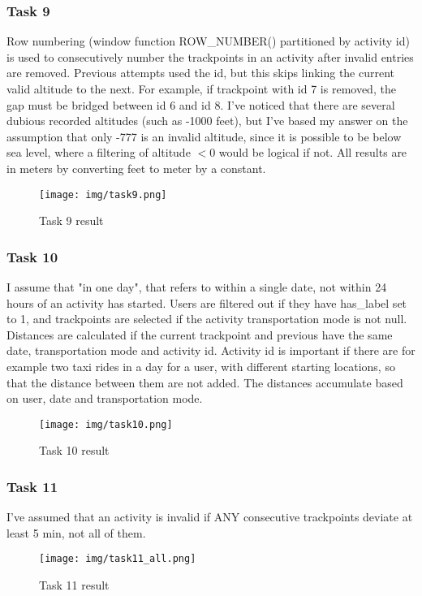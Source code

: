 \documentclass[12pt, titlepage]{report}
\begin{document}
\subsubsection*{Task 9}
Row numbering (window function ROW\_NUMBER() partitioned by activity id) is used to consecutively number the trackpoints in an activity after invalid entries are removed. Previous attempts used the id, but this skips linking the current valid altitude to the next. For example, if trackpoint with id 7 is removed, the gap must be bridged between id 6 and id 8. I've noticed that there are several dubious recorded altitudes (such as -1000 feet), but I've based my answer on the assumption that only -777 is an invalid altitude, since it is possible to be below sea level, where a filtering of altitude $<0$ would be logical if not. All results are in meters by converting feet to meter by a constant.
\begin{figure}[H]
    \centering
    \texttt{[image: img/task9.png]}
    \caption{Task 9 result}
    \label{fig:my_label}
\end{figure}
\subsubsection*{Task 10}
I assume that "in one day", that refers to within a single date, not within 24 hours of an activity has started. Users are filtered out if they have has\_label set to 1, and trackpoints are selected if the activity transportation mode is not null. Distances are calculated if the current trackpoint and previous have the same date, transportation mode and activity id. Activity id is important if there are for example two taxi rides in a day for a user, with different starting locations, so that the distance between them are not added. The distances accumulate based on user, date and transportation mode.
\begin{figure}[H]
    \centering
    \texttt{[image: img/task10.png]}
    \caption{Task 10 result}
    \label{fig:my_label}
\end{figure}
\subsubsection*{Task 11}
I've assumed that an activity is invalid if ANY consecutive trackpoints deviate at least 5 min, not all of them.
\begin{figure}[H]
    \centering
    \texttt{[image: img/task11\_all.png]}
    \caption{Task 11 result}
    \label{fig:my_label}
\end{figure}
\end{document}
